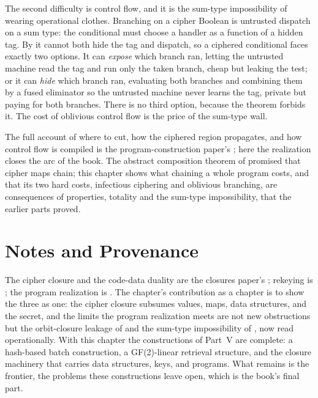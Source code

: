 \begin{remark}
\label{rem:control-flow}
The second difficulty is control flow, and it is the sum-type impossibility
of  wearing operational clothes. Branching on a
cipher Boolean is untrusted dispatch on a sum type: the conditional must
choose a handler as a function of a hidden tag. By
 it cannot both hide the tag and dispatch, so a
ciphered conditional faces exactly two options. It can \emph{expose} which
branch ran, letting the untrusted machine read the tag and run only the taken
branch, cheap but leaking the test; or it can \emph{hide} which branch ran,
evaluating both branches and combining them by a fused eliminator so the
untrusted machine never learns the tag, private but paying for both branches.
There is no third option, because the theorem forbids it. The cost of
oblivious control flow is the price of the sum-type wall.
\end{remark}

The full account of where to cut, how the ciphered region propagates, and how
control flow is compiled is the program-construction paper's
\cite{towell2026cipherprog}; here the realization closes the arc of the book.
The abstract composition theorem of  promised that
cipher maps chain; this chapter shows what chaining a whole program costs,
and that its two hard costs, infectious ciphering and oblivious branching,
are consequences of properties, totality and the sum-type impossibility, that
the earlier parts proved.

\section{Notes and Provenance}
\label{sec:ch13-notes}

The cipher closure and the code-data duality are the closures paper's
\cite{towell2026closures}; rekeying is \cite{towell2026rekeying}; the program
realization is \cite{towell2026cipherprog}. The chapter's contribution as a
chapter is to show the three as one: the cipher closure subsumes values,
maps, data structures, and the secret, and the limits the program
realization meets are not new obstructions but the orbit-closure leakage of
 and the sum-type impossibility of
, now read operationally. With this chapter the
constructions of Part~V are complete: a hash-based batch construction, a
GF(2)-linear retrieval structure, and the closure machinery that carries data
structures, keys, and programs. What remains is the frontier, the problems
these constructions leave open, which is the book's final part.
